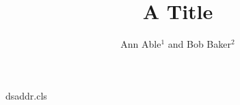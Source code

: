 \begin{filecontents*}[overwrite]{dsaddr.cls}
\newif\ifds@split
\newcommand{\address}[1]{\gdef\ds@address{#1\ifds@split\relax\fi}}
\let\ds@address\empty
\def\@maketitle{\begin{center}{\LARGE\@title\par}\vskip1em{\large\@author\par}\vskip1em
  \ifx\ds@address\empty\else{\small\ds@address\par}\fi\end{center}}
\end{filecontents*}
\documentclass{dsaddr}

\title{A Title}
\author{Ann Able$^{1}$ and Bob Baker$^{2}$}
\address{$^{1}$Univ A, Town\\ $^{2}$Univ B, City}
\maketitle
Text.

